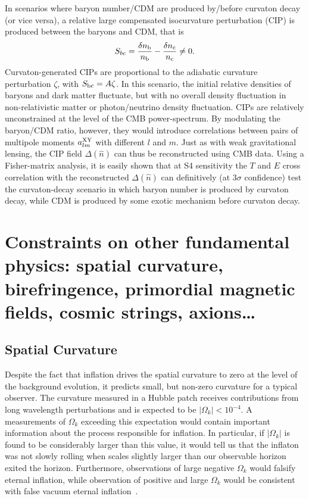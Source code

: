 In scenarios where baryon number/CDM are produced by/before curvaton decay (or vice versa), a relative large compensated isocurvature perturbation (CIP) is produced between the baryons and CDM, that is
\begin{equation}
S_{bc}=\frac{\delta n_{\rm b}}{n_{\rm b}}-\frac{\delta n_{\rm c}}{n_{\rm c}}\neq 0.
\end{equation} Curvaton-generated CIPs are proportional to the adiabatic curvature perturbation $\zeta$, with $S_{\rm bc}=A\zeta$. In this scenario, the initial relative densities of baryons and dark matter fluctuate, but with no overall density fluctuation in non-relativistic matter or photon/neutrino density fluctuation. CIPs are relatively unconstrained at the level of the CMB power-spectrum. By modulating the baryon/CDM ratio, however, they would introduce correlations between pairs of multipole moments $a_{lm}^{\rm XY}$ with different $l$ and $m$. Just as with weak gravitational lensing, the CIP field $\Delta(\hat{n})$ can thus be reconstructed using CMB data. Using a Fisher-matrix analysis, it is easily shown that at S4 sensitivity the $T$ and $E$ cross correlation with the reconstructed $\Delta(\hat{n})$ can definitively (at $3\sigma$ confidence) test the curvaton-decay scenario in which baryon number is produced by curvaton decay, while CDM is produced by some exotic mechanism before curvaton decay.

\section{Constraints on other fundamental physics: spatial curvature, birefringence, primordial magnetic fields, cosmic strings, axions\dots}
\label{sec:other_topics}

\subsection{Spatial Curvature}

Despite the fact that inflation drives the spatial curvature to zero at the level of the background evolution, it predicts small, but non-zero curvature for a typical observer. The curvature measured in a Hubble patch receives contributions from long wavelength perturbations and is expected to be $|\Omega_k|<10^{-4}$. A measurements of $\Omega_k$ exceeding this expectation would contain important information about the process responsible for inflation. In particular, if $|\Omega_k|$ is found to be considerably larger than this value, it would tell us that the inflaton was not slowly rolling when scales slightly larger than our observable horizon exited the horizon. Furthermore, observations of large negative $\Omega_k$ would falsify eternal inflation, while observation of positive and large $\Omega_k$ would be consistent with false vacuum eternal inflation~\cite{Guth:2012ww,Kleban:2012ph}.

